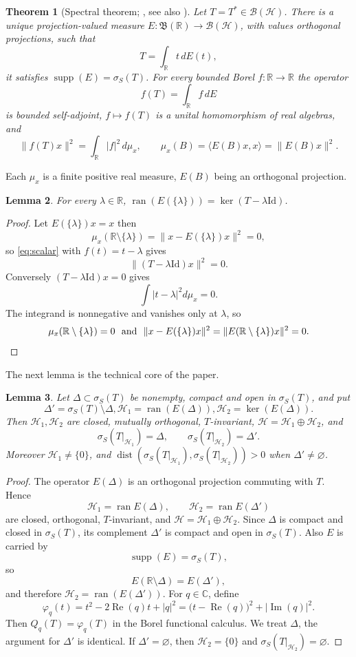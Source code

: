 \documentclass[12pt,a4paper]{article}
\theoremstyle{plain}
\newtheorem{theorem}{Theorem}[section]
\newtheorem{lemma}[theorem]{Lemma}
\theoremstyle{definition}
\theoremstyle{remark}
\newcommand{\RR}{\mathbb R}
\newcommand{\CC}{\mathbb C}
\newcommand{\BB}{\mathcal B}
\newcommand{\Bor}{\mathfrak B}
\newcommand{\Id}{\mathrm{Id}}
\newcommand{\HS}{\mathcal H}
\newcommand{\sigS}{\sigma_S}
\DeclareMathOperator{\ran}{ran}
\DeclareMathOperator{\dist}{dist}
\DeclareMathOperator{\supp}{supp}
\DeclareMathOperator{\Rea}{Re}
\DeclareMathOperator{\Ima}{Im}
\begin{document}
{\begin{theorem}[{Spectral theorem; \cite[Corollary~11.2.2(ii)]{ColomboGantnerKimsey2018},
see also \cite{GhiloniMorettiPerotti2013,AlpayColomboKimsey2016}}]
Let $T=T^*\in\BB(\HS)$. There is a unique projection-valued measure
$E:\Bor(\RR)\to\BB(\HS)$, with values orthogonal projections, such
that $$T=\int_\RR t\,dE(t),$$ it satisfies $\supp(E)=\sigS(T)$. For
every bounded Borel $f:\RR\to\RR$ the operator $$f(T)=\int_\RR f\,dE$$
is bounded self-adjoint, $f\mapsto f(T)$ is a unital homomorphism of
real algebras, and
\begin{equation}
 \|f(T)x\|^2=\int_\RR|f|^2\,d\mu_x,
 \qquad
 \mu_x(B)=\langle E(B)x,x\rangle=\|E(B)x\|^2 .
 \label{eq:scalar}
\end{equation}
\end{theorem}
Each $\mu_x$ is a finite positive real measure, $E(B)$ being an
orthogonal projection.

\begin{lemma}
\label{lem:eigenspace}
For every $\lambda\in\RR$, $\ran(E(\{\lambda\}))=\ker(T-\lambda\Id)$.
\end{lemma}

\begin{proof}
Let $E(\{\lambda\})x=x$ then
$$\mu_x(\RR\setminus\{\lambda\})=\|x-E(\{\lambda\})x\|^2=0,$$ so
\eqref{eq:scalar} with $f(t)=t-\lambda$ gives
$$\|(T-\lambda\Id)x\|^2=0.$$ Conversely $(T-\lambda\Id)x=0$ gives
$$\int|t-\lambda|^2d\mu_x=0.$$ The integrand is nonnegative and vanishes
only at $\lambda$, so $$\mu_x(\RR\setminus\{\lambda\})=0 ~~\hbox{and}~~
\|x-E(\{\lambda\})x\|^2=\|E(\RR\setminus\{\lambda\})x\|^2=0.$$
\end{proof}

The next lemma is the technical core of the paper.

\begin{lemma}
\label{lem:restriction}
Let $\Delta\subset\sigS(T)$ be nonempty, compact and open in
$\sigS(T)$, and put $$\Delta'=\sigS(T)\setminus\Delta,
\HS_1=\ran(E(\Delta)), \HS_2=\ker(E(\Delta)).$$ Then $\HS_1,\HS_2$
are closed, mutually orthogonal, $T$-invariant,
$\HS=\HS_1\oplus\HS_2$, and
\[
 \sigS(T|_{\HS_1})=\Delta,\qquad \sigS(T|_{\HS_2})=\Delta' .
\]
Moreover $\HS_1\neq\{0\}$, and
$\dist(\sigS(T|_{\HS_1}),\sigS(T|_{\HS_2}))>0$ when
$\Delta'\neq\varnothing$.
\end{lemma}

\begin{proof}
The operator \(E(\Delta)\) is an orthogonal projection commuting with \(T\). Hence
\[
\HS_1=\ran E(\Delta),\qquad \HS_2=\ran E(\Delta')
\]
are closed, orthogonal, \(T\)-invariant, and \(\HS=\HS_1\oplus\HS_2\). Since \(\Delta\) is compact and closed in \(\sigS(T)\), its complement \(\Delta'\) is compact and open in \(\sigS(T)\). Also \(E\) is carried by $$\supp(E)=\sigS(T),$$ so
\[
E(\RR\setminus\Delta)=E(\Delta'),
\]
and therefore \(\HS_2=\ran(E(\Delta'))\). For \(q\in\CC\), define
\[
\varphi_q(t)=t^2-2\Rea(q)t+|q|^2
=\bigl(t-\Rea(q)\bigr)^2+|\Ima(q)|^2 .
\]
Then \(Q_q(T)=\varphi_q(T)\) in the Borel functional calculus. We treat \(\Delta\), the argument for \(\Delta'\) is identical. If \(\Delta'=\varnothing\), then \(\HS_2=\{0\}\) and \(\sigS(T|_{\HS_2})=\varnothing\).


\end{proof}}
\end{document}
